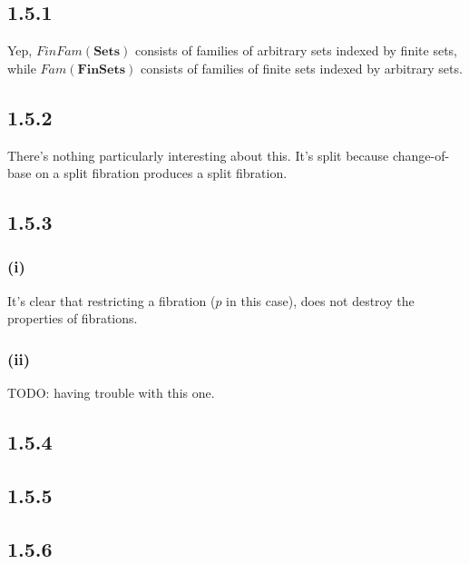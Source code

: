 \documentclass{article}
\newcommand{\mbf}{\mathbf}
\begin{document}
\subsection*{1.5.1}

Yep, $FinFam(\mbf{Sets})$ consists of families of arbitrary sets indexed by finite sets,
while $Fam(\mbf{FinSets})$ consists of families of finite sets indexed by arbitrary sets.

\subsection*{1.5.2}


There's nothing particularly interesting about this. It's split because change-of-base on a split
fibration produces a split fibration. 

\subsection*{1.5.3}

\subsubsection*{(i)}

It's clear that restricting a fibration ($p$ in this case), does not destroy the properties of fibrations.

\subsubsection*{(ii)}

TODO: having trouble with this one.

\subsection*{1.5.4}
\subsection*{1.5.5}

\subsection*{1.5.6}
\end{document}
